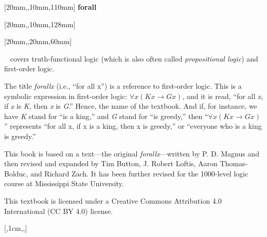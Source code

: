 \documentclass[bleedwidth=6.35mm, marklength=0mm, coverheight=228.6mm, coverwidth=152.4mm, spinewidth=12.53mm]{bookcover}
\begin{document}
\begin{bookcover}

[20mm,,10mm,110mm]{\sffamily   %
\fontsize{44}{44}\selectfont\hfill \textbf{forall\textcolor{white}{x}}} 		%

[20mm,,10mm,128mm]{\sffamily
\fontsize{20}{20}\selectfont\hfill \textbf{\textls{\textcolor{white}{THE MISSISSIPPI STATE EDITION}}}}  







[20mm,,20mm,60mm]{\sffamily    %
\textcolor{white}{}~ covers truth-functional logic (which is also often called \textit{propositional logic}) and first-order logic. 

\quad The title \textit{forallx} (i.e., ``for all x'') is a reference to first-order logic. This is a symbolic expression in first-order logic: $\forall x(Kx \rightarrow Gx)$, and it is read, ``for all \textit{x}, if \textit{x} is \textit{K}, then \textit{x} is \textit{G}.'' Hence, the name of the textbook. And if, for instance, we have \textit{K} stand for ``is a king,'' and \textit{G} stand for ``is greedy,'' then ``$\forall x(Kx \rightarrow Gx)$'' represents ``for all x, if x is a king, then x is greedy,'' or ``everyone who is a king is greedy.''

\quad This book is based on a text---the original \textit{forallx}---written by P. D. Magnus and then revised and expanded by Tim Button, J. Robert Loftis, Aaron Thomas-Bolduc, and Richard Zach. It has been further revised for the 1000-level logic course at Mississippi State University.

\quad This textbook is licensed under a Creative Commons Attribution 4.0 International (CC BY 4.0) license.  
}


[,1cm,,]{
\vfill
\centering\textcolor{forallx-orange}{
\colorbox{white}{%
}}}


\end{bookcover}
\end{document}
